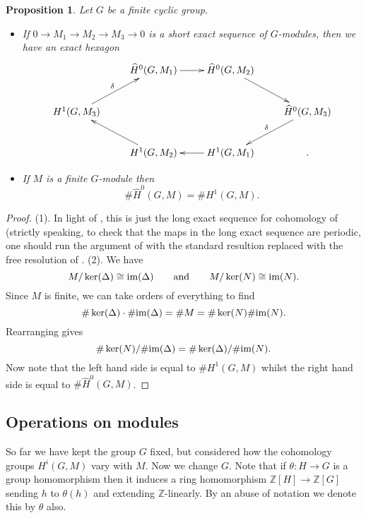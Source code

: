 \documentclass[11pt]{amsart}
\numberwithin{equation}{section}
\newtheorem{proposition}[equation]{Proposition}
\theoremstyle{remark}
\theoremstyle{remark}
\theoremstyle{remark}
\theoremstyle{definition}
\theoremstyle{definition}
\theoremstyle{definition}
\theoremstyle{definition}
\theoremstyle{definition}
\theoremstyle{definition}
\begin{document}
\begin{proposition} \label{order of cohom cyclic lemma}
Let $G$ be a finite cyclic group. 
\begin{itemize}
\item[(1)] If $0\rightarrow M_1 \rightarrow M_2 \rightarrow M_3\rightarrow 0$ is a short exact sequence of $G$-modules, then we have an exact hexagon
\[\xymatrix{&\widehat{H}^0(G,M_1)\ar[r]&\widehat{H}^0(G,M_2)\ar[rd]&\\H^1(G,M_3)\ar[ru]^\delta& & & \widehat{H}^0(G,M_3)\ar[ld]_\delta\\& H^1(G,M_2)\ar[lu] & H^1(G,M_1)\ar[l]& .}\]
\item[(2)] If $M$ is a finite $G$-module then 
\[\#\widehat{H}^0(G,M)=\#H^1(G,M).\]
\end{itemize}
\end{proposition}

\begin{proof}
(1). In light of , this is just the long exact sequence for cohomology of  (strictly speaking, to check that the maps in the long exact sequence are periodic, one should run the argument of  with the standard resultion replaced with the free resolution of .
(2). We have
\[M/\ker(\Delta)\cong \textup{im}(\Delta)~~~~~\textup{ and }~~~~~ M/\ker(N)\cong \textup{im}(N).\]
Since $M$ is finite, we can take orders of everything to find 
\[\#\ker(\Delta) \cdot \#\textup{im}(\Delta)=\#M=\#\ker(N)\#\textup{im}(N).\]
Rearranging gives
\[\#\ker(N)/\#\textup{im}(\Delta)=\#\ker(\Delta)/\#\textup{im}(N).\]
Now note that the left hand side is equal to $\#H^1(G,M)$ whilst the right hand side is equal to $ \#\widehat{H}^0(G,M)$.
\end{proof}

\subsection{Operations on modules}

So far we have kept the group $G$ fixed, but considered how the cohomology groups $H^i(G,M)$ vary with $M$. Now we change $G$. Note that if $\theta:H\rightarrow G$ is a group homomorphism then it induces a ring homomorphism $\mathbb{Z}[H]\rightarrow \mathbb{Z}[G]$ sending $h$ to $\theta(h)$ and extending $\mathbb{Z}$-linearly. By an abuse of notation we denote this by $\theta$ also.  
\end{document}
